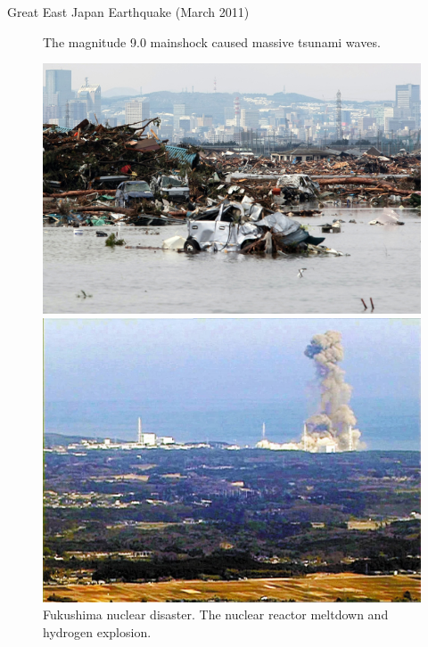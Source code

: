 \documentclass[serif, aspectratio=169]{beamer}
\begin{document}
\begin{frame}{Great East Japan Earthquake (March 2011)}

  \vspace{-0.10cm} %

    \begin{minipage}{1.00\textwidth}
    
    \raggedright %
    
    \begin{figure}[h!]

      \begin{minipage}[t]{0.48\textwidth}
        \centering
        \caption*{The magnitude 9.0 mainshock caused massive tsunami waves.}
        \includegraphics[width=\textwidth,height=0.8\textwidth]{Tsunami.jpg}
      \end{minipage}
      \hfill
      \begin{minipage}[t]{0.48\textwidth}
        \centering
        
        \caption*{Fukushima nuclear disaster. The nuclear reactor meltdown and hydrogen explosion.}
        \includegraphics[width=\textwidth,height=0.8\textwidth]{Nuclear_explosion.png}
      \end{minipage}


\end{figure}
\end{minipage}
\end{frame}
\end{document}
